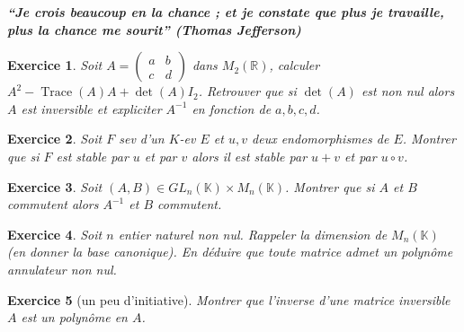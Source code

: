\documentclass[12pt,a4paper]{article}
\newcommand{\R}{\mathbb{R}}
\newcommand{\K}{\mathbb{K} }
\DeclareMathOperator{\tr}{Trace}
\theoremstyle{break}
\theoremstyle{break}
\newtheorem{Exo}{Exercice}
\begin{document}
\emph{\textbf{“Je crois beaucoup en la chance ; et je constate que plus je travaille, plus la chance me sourit” (Thomas Jefferson)}}




\begin{Exo}
	Soit $A=\begin{pmatrix}
	a & b\\
	c & d
	\end{pmatrix}$ dans $M_2(\R)$, calculer $A^2-\tr(A)A+\det(A)I_2$. Retrouver que si $\det(A)$ est non nul alors $A$ est inversible et expliciter $A^{-1}$ en fonction de $a,b,c,d$.
\end{Exo}


\begin{Exo}
	Soit $F$ sev d'un $K$-ev $E$ et $u,v$ deux endomorphismes de $E$. Montrer que si $F$ est stable par $u$ et par $v$ alors il est stable par $u+v$ et par $u\circ v$.
\end{Exo}

\begin{Exo}
	Soit $(A,B)\in GL_n(\K)\times M_n(\K)$. Montrer que si $A$ et $B$ commutent alors $A^{-1}$ et $B$ commutent.
\end{Exo}



\begin{Exo}
	Soit $n$ entier naturel non nul. Rappeler la dimension de $M_n(\K)$ (en donner la base canonique). En déduire que toute matrice admet un polynôme annulateur non nul.
\end{Exo}

\begin{Exo}[un peu d'initiative]
	Montrer que l'inverse d'une matrice inversible $A$ est un polynôme en $A$.
\end{Exo}
\end{document}
